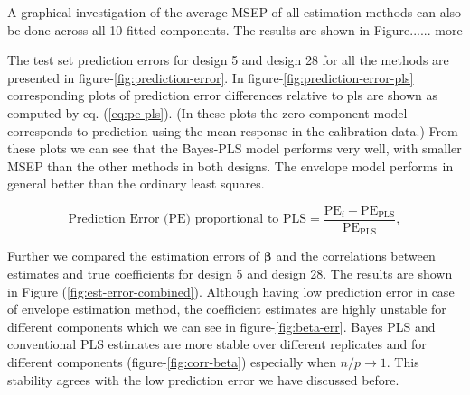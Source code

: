 \documentclass[a4paper, 11pt]{article}
\begin{document}
A graphical investigation of the average MSEP of all estimation methods can also be done across all 10 fitted components. The results are shown in Figure...... more

The test set prediction errors for design 5 and design 28 for all the methods are presented in figure-\ref{fig:prediction-error}. In figure-\ref{fig:prediction-error-pls} corresponding plots of prediction error differences relative to pls are shown as computed by eq. (\ref{eq:pe-pls}). (In these plots the zero component model corresponds to prediction using the mean response in the calibration data.) From these plots we can see that the Bayes-PLS model performs very well, with smaller MSEP than the other methods in both designs. The envelope model performs in general better than the ordinary least squares.


\begin{equation}
  \label{eq:pe-pls}
  \text{Prediction Error (PE) proportional to PLS} =
  \frac{\text{PE}_i - \text{PE}_\text{PLS}}{\text{PE}_\text{PLS}},
\end{equation}


Further we compared the estimation errors of $\boldsymbol{\beta}$ and the correlations between estimates and true coefficients for design 5 and design 28. The results are shown in Figure (\ref{fig:est-error-combined}). Although having low prediction error in case of envelope estimation method, the coefficient estimates are highly unstable for different components which we can see in figure-\ref{fig:beta-err}. Bayes PLS and conventional PLS estimates are more stable over different replicates and for different components (figure-\ref{fig:corr-beta}) especially when $n/p \rightarrow 1$. This stability agrees with the low prediction error we have discussed before.
\end{document}

